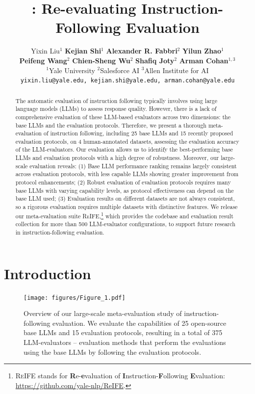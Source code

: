 \documentclass[11pt]{article}
\title{\ours: Re-evaluating Instruction-Following Evaluation}
\author{
 Yixin Liu\Thanks{~Equal contribution}$^{1}$ 
 \quad \textbf{Kejian Shi}\footnotemark[1]$^{1}$
 \quad \textbf{Alexander R. Fabbri}$^{2}$
 \quad \textbf{Yilun Zhao}$^{1}$ \\
 \quad \textbf{Peifeng Wang}$^{2}$ 
 \quad \textbf{Chien-Sheng Wu}$^{2}$ 
  \quad \textbf{Shafiq Joty}$^{2}$ 
 \quad \textbf{Arman Cohan}$^{1,3}$ \vspace{6pt}\\
  $^1$Yale University\quad 
  $^2$Salesforce AI\quad
  $^3$Allen Institute for AI
  \vspace{6pt}\\
  \texttt{yixin.liu@yale.edu, kejian.shi@yale.edu, arman.cohan@yale.edu}
 }
\newcommand{\ours}{\textsc{ReIFE}\xspace}
\begin{document}
\maketitle
\begin{abstract}
The automatic evaluation of instruction following typically involves using large language models (LLMs) to assess response quality. 
However, there is a lack of comprehensive evaluation of these LLM-based evaluators across two dimensions: the base LLMs and the evaluation protocols.
Therefore, we present a thorough meta-evaluation of instruction following, including 25 base LLMs and 15 recently proposed evaluation protocols, on 4 human-annotated datasets, assessing the evaluation accuracy of the LLM-evaluators.
Our evaluation allows us to identify the best-performing base LLMs and evaluation protocols with a high degree of robustness.
Moreover, our large-scale evaluation reveals:
(1) Base LLM performance ranking remains largely consistent across evaluation protocols, with less capable LLMs showing greater improvement from protocol enhancements;
(2) Robust evaluation of evaluation protocols requires many base LLMs with varying capability levels, as protocol effectiveness can depend on the base LLM used;
(3) Evaluation results on different datasets are not always consistent, so a rigorous evaluation requires multiple datasets with distinctive features.
We release our meta-evaluation suite \ours,\footnote{\ours stands for \textbf{R}e-\textbf{e}valuation of \textbf{I}nstruction-\textbf{F}ollowing \textbf{E}valuation: \url{https://github.com/yale-nlp/ReIFE}.} which provides the codebase and evaluation result collection for more than 500 LLM-evaluator configurations, to support future research in instruction-following evaluation.
\end{abstract}



\section{Introduction}

\begin{figure}[t!]
    \centering
    \texttt{[image: figures/Figure\_1.pdf]}
    \caption{\label{fig:intro}Overview of our large-scale meta-evaluation study of instruction-following evaluation.
    We evaluate the capabilities of 25 open-source base LLMs and 15 evaluation protocols, resulting in a total of 375 LLM-evaluators --  evaluation methods that perform the evaluations using the base LLMs by following the evaluation protocols.
    }
\end{figure}
\end{document}
